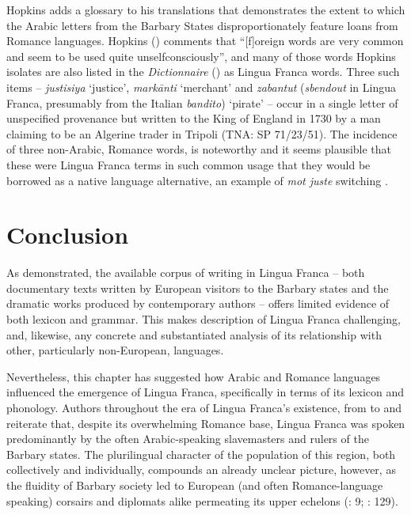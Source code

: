 \documentclass[output=paper]{langsci/langscibook}
\begin{document}
	Hopkins adds a glossary to his translations that demonstrates the extent to which the Arabic letters from the Barbary States disproportionately feature loans from Romance languages. Hopkins (\citeyear[x]{Hopkins1982}) comments that “[f]oreign words are very common and seem to be used quite unselfconsciously”, and many of those words Hopkins isolates are also listed in the \textit{Dictionnaire} (\citeyear{Anonymous1830}) as Lingua Franca words. Three such items -- \textit{justisiya} ‘justice’, \textit{markānti} ‘merchant’ and \textit{zabantut} (\textit{sbendout} in Lingua Franca, presumably from the Italian \textit{bandito}) ‘pirate’ -- occur in a single letter of unspecified provenance but written to the King of England in 1730 by a man claiming to be an Algerine trader in Tripoli (TNA: SP 71/23/51). The incidence of three non-Arabic, Romance words, is noteworthy and it seems plausible that these were Lingua Franca terms in such common usage that they would be borrowed as a native language alternative, an example of \textit{mot juste} switching \citep[32]{Gardner-Chloros2009}.
	
\section{Conclusion}
	
	As demonstrated, the available corpus of writing in Lingua Franca – both documentary texts written by European visitors to the Barbary states and the dramatic works produced by contemporary authors – offers limited evidence of both lexicon and grammar. This makes description of Lingua Franca challenging, and, likewise, any concrete and substantiated analysis of its relationship with other, particularly non-European, languages.
	
	Nevertheless, this chapter has suggested how Arabic and Romance languages influenced the emergence of Lingua Franca, specifically in terms of its lexicon and phonology. Authors throughout the era of Lingua Franca’s existence, from \citet{Haedo1612} to \citet{Broughton1839} and \citet{Frank1850} reiterate that, despite its overwhelming Romance base, Lingua Franca was spoken predominantly by the often Arabic-speaking slavemasters and rulers of the Barbary states. The plurilingual character of the population of this region, both collectively and individually, compounds an already unclear picture, however, as the fluidity of Barbary society led to European (and often Romance-language speaking) corsairs and diplomats alike permeating its upper echelons (\citealt{Haedo1612}: 9; \citealt{Garcès2011}: 129).
	
\end{document}
